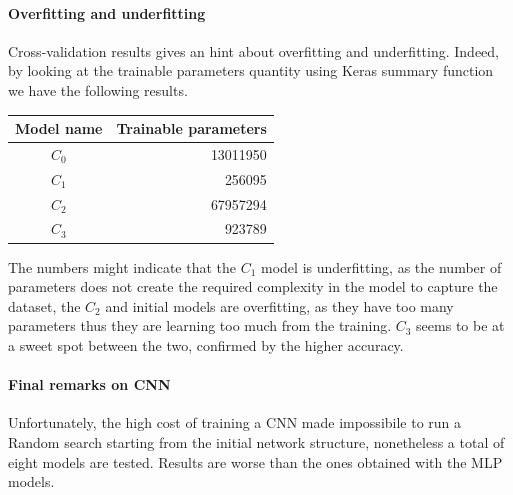 \paragraph{Overfitting and underfitting}
Cross-validation results gives an hint about overfitting and underfitting. Indeed, 
by looking at the trainable parameters quantity using Keras summary function we have the following results.
\begin{center}
    \begin{tabular}{ |c|r| } 
        \hline
        Model name & Trainable parameters\\
        \hline
        $C_0$ & 13011950 \\
        $C_1$ & 256095 \\
        $C_2$ & 67957294 \\
        $C_3$ & 923789 \\
        \hline
    \end{tabular}
\end{center}
The numbers might indicate that the $C_1$ model is underfitting, as the number 
of parameters does not create the required complexity in the model to capture the dataset, 
the $C_2$ and initial models are overfitting, as they have too many parameters 
thus they are learning too much from the training. 
$C_3$ seems to be at a sweet spot between the two, confirmed by the higher accuracy.

\paragraph{Final remarks on CNN}
Unfortunately, the high cost of training a CNN made impossibile to run a Random search 
starting from the initial network structure, nonetheless a total 
of eight models are tested. Results are worse than the ones obtained 
with the MLP models. 
\newpage